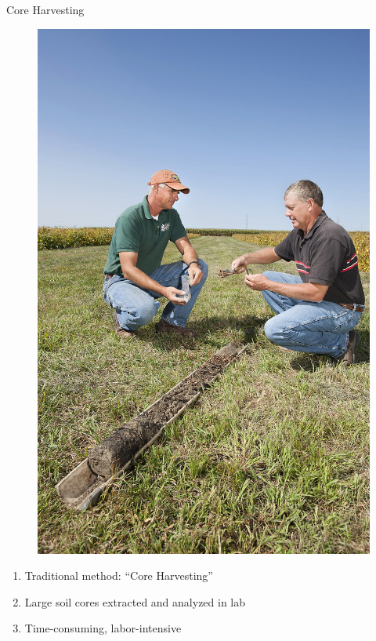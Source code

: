 \documentclass[10pt,hyperref={colorlinks,citecolor=blue,urlcolor=peking_blue,linkcolor=}]{beamer}
\theoremstyle{plain}
\begin{document}
\begin{frame}{Core Harvesting}
\begin{figure}[Core Harvest]
\begin{center}
\includegraphics[width=1\linewidth]{../Figures/Misc/SoilCore.jpg}
\end{center}
\end{figure}
\begin{enumerate}
\item Traditional method: “Core Harvesting”
\item Large soil cores extracted and analyzed in lab
\item Time-consuming, labor-intensive
\end{enumerate}
\end{frame}
\end{document}
